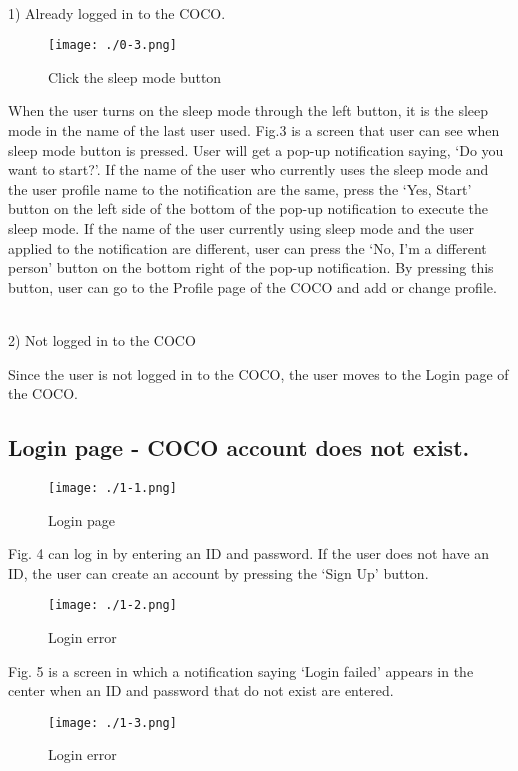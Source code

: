 \documentclass[conference]{IEEEtran}
\begin{document}
\\1) Already logged in to the COCO.
\begin{figure}[H]
\texttt{[image: ./0-3.png]}
\centering
\caption{Click the sleep mode button}
\end{figure}

When the user turns on the sleep mode through the left button, it is the sleep mode in the name of the last user used. Fig.3 is a screen that user can see when sleep mode button is pressed. User will get a pop-up notification saying, ‘Do you want to start?’. If the name of the user who currently uses the sleep mode and the user profile name to the notification are the same, press the ‘Yes, Start’ button on the left side of the bottom of the pop-up notification to execute the sleep mode. If the name of the user currently using sleep mode and the user applied to the notification are different, user can press the ‘No, I'm a different person’ button on the bottom right of the pop-up notification. By pressing this button, user can go to the Profile page of the COCO and add or change profile.

\\2) Not logged in to the COCO

Since the user is not logged in to the COCO, the user moves to the Login page of the COCO.

\subsection{Login page - COCO account does not exist.}
\begin{figure}[H]
\texttt{[image: ./1-1.png]}
\centering
\caption{Login page}
\end{figure}

Fig. 4 can log in by entering an ID and password. If the user does not have an ID, the user can create an account by pressing the ‘Sign Up’ button.

\begin{figure}[H]
\texttt{[image: ./1-2.png]}
\centering
\caption{Login error}
\end{figure}

Fig. 5 is a screen in which a notification saying ‘Login failed’ appears in the center when an ID and password that do not exist are entered.

\begin{figure}[H]
\texttt{[image: ./1-3.png]}
\centering
\caption{Login error}
\end{figure}
\end{document}
